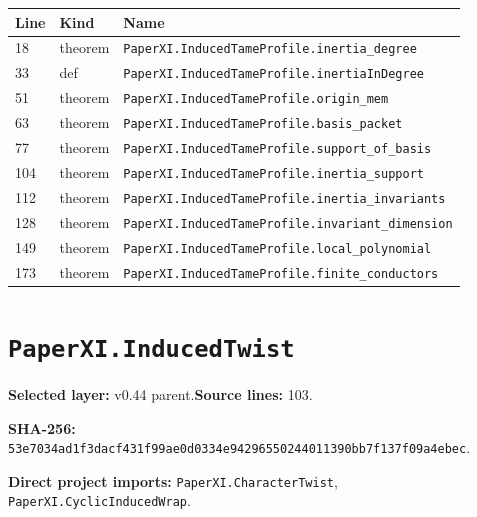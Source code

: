 \documentclass[10pt,oneside]{book}
\begin{document}
\begin{longtable}{@{}p{}p{}p{}@{}}\toprule Line&Kind&Name\\\midrule\endhead

18&theorem&\nolinkurl{PaperXI.InducedTameProfile.inertia_degree}\\

33&def&\nolinkurl{PaperXI.InducedTameProfile.inertiaInDegree}\\

51&theorem&\nolinkurl{PaperXI.InducedTameProfile.origin_mem}\\

63&theorem&\nolinkurl{PaperXI.InducedTameProfile.basis_packet}\\

77&theorem&\nolinkurl{PaperXI.InducedTameProfile.support_of_basis}\\

104&theorem&\nolinkurl{PaperXI.InducedTameProfile.inertia_support}\\

112&theorem&\nolinkurl{PaperXI.InducedTameProfile.inertia_invariants}\\

128&theorem&\nolinkurl{PaperXI.InducedTameProfile.invariant_dimension}\\

149&theorem&\nolinkurl{PaperXI.InducedTameProfile.local_polynomial}\\

173&theorem&\nolinkurl{PaperXI.InducedTameProfile.finite_conductors}\\

\bottomrule\end{longtable}

\section{\texorpdfstring{\nolinkurl{PaperXI.InducedTwist}}{PaperXI.InducedTwist}}\label{module:PaperXI.InducedTwist}

\textbf{Selected layer:} v0.44 parent.\quad\textbf{Source lines:} 103.\par\textbf{SHA-256:} {\scriptsize\nolinkurl{53e7034ad1f3dacf431f99ae0d0334e94296550244011390bb7f137f09a4ebec}}.


\textbf{Direct project imports:} \nolinkurl{PaperXI.CharacterTwist}, \nolinkurl{PaperXI.CyclicInducedWrap}.
\end{document}
